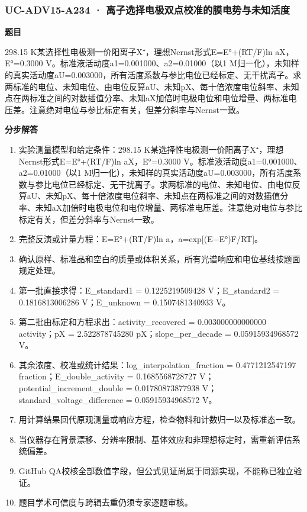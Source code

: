 \documentclass[UTF8,11pt,a4paper]{ctexart}
\begin{document}
\subsubsection*{UC-ADV15-A234 · 离子选择电极双点校准的膜电势与未知活度}
\noindent\textbf{题目}\par
298.15 K某选择性电极测一价阳离子X⁺，理想Nernst形式E=E°+(RT/F)ln aX，E°=0.3000 V。标准液活动度a1=0.001000、a2=0.01000（以1 M归一化），未知样的真实活动度aU=0.003000，所有活度系数与参比电位已经标定、无干扰离子。求两标准的电位、未知电位、由电位反算aU、未知pX、每十倍浓度电位斜率、未知点在两标准之间的对数插值分率、未知aX加倍时电极电位和电位增量、两标准电压差。注意绝对电位与参比标定有关，但差分斜率与Nernst一致。\par
\medskip\noindent\textbf{分步解答}
\begin{enumerate}
\item 实验测量模型和给定条件：298.15 K某选择性电极测一价阳离子X⁺，理想Nernst形式E=E°+(RT/F)ln aX，E°=0.3000 V。标准液活动度a1=0.001000、a2=0.01000（以1 M归一化），未知样的真实活动度aU=0.003000，所有活度系数与参比电位已经标定、无干扰离子。求两标准的电位、未知电位、由电位反算aU、未知pX、每十倍浓度电位斜率、未知点在两标准之间的对数插值分率、未知aX加倍时电极电位和电位增量、两标准电压差。注意绝对电位与参比标定有关，但差分斜率与Nernst一致。
\item 完整反演或计量方程：E=E°+(RT/F)ln a，a=exp[(E−E°)F/RT]。
\item 确认原样、标准品和空白的质量或体积关系，所有光谱响应和电位基线按题面规定处理。
\item 第一批直接求得：E\_standard1 = 0.1225219509428 V；E\_standard2 = 0.1816813006286 V；E\_unknown = 0.1507481340933 V。
\item 第二批由标定和方程求出：activity\_recovered = 0.003000000000000 activity；pX = 2.522878745280 pX；slope\_per\_decade = 0.05915934968572 V。
\item 其余浓度、校准或统计结果：log\_interpolation\_fraction = 0.4771212547197 fraction；E\_double\_activity = 0.1685568728727 V；potential\_increment\_double = 0.01780873877938 V；standard\_voltage\_difference = 0.05915934968572 V。
\item 用计算结果回代原观测量或响应方程，检查物料和计数归一以及标准态一致。
\item 当仪器存在背景漂移、分辨率限制、基体效应和非理想标定时，需重新评估系统偏差。
\item GitHub QA校核全部数值字段，但公式见证尚属于同源实现，不能称已独立验证。
\item 题目学术可信度与跨辑去重仍须专家逐题审核。
\end{enumerate}
\end{document}

